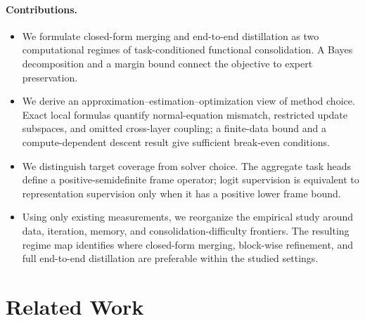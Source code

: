 \documentclass[letterpaper]{article} %
\theoremstyle{plain}
\theoremstyle{definition}
\begin{document}
\paragraph{Contributions.}
\begin{itemize}
    \item We formulate closed-form merging and end-to-end distillation as two
computational regimes of task-conditioned functional consolidation.
A Bayes decomposition and a margin bound connect the objective to expert preservation.
    \item We derive an approximation--estimation--optimization view of method choice.
Exact local formulas quantify normal-equation mismatch, restricted update subspaces, and omitted cross-layer coupling; a finite-data bound and a compute-dependent descent result give sufficient break-even conditions.
    \item We distinguish target coverage from solver choice. The aggregate task heads
define a positive-semidefinite frame operator; logit supervision is equivalent to representation supervision only when it has a positive lower frame bound.
    \item Using only existing measurements, we reorganize the empirical study around
data, iteration, memory, and consolidation-difficulty frontiers.
The resulting regime map identifies where closed-form merging, block-wise refinement, and full end-to-end distillation are preferable within the studied settings.
\end{itemize}

\section{Related Work}
\label{sec:related}
\end{document}
